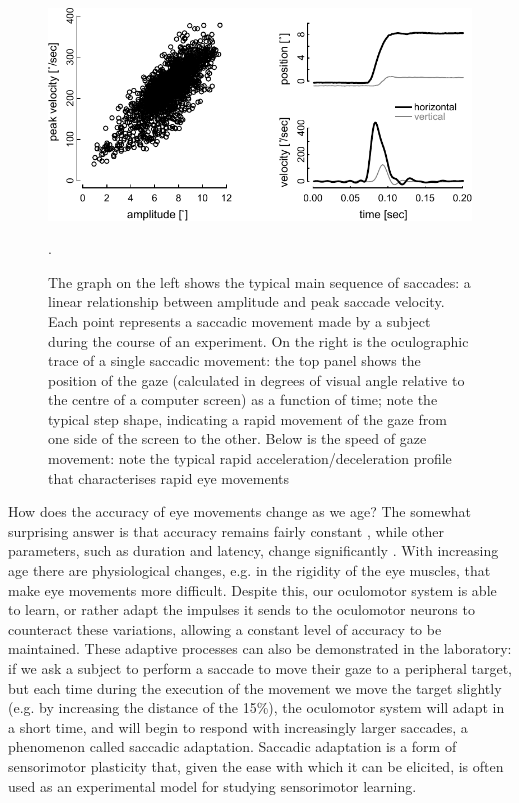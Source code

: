 \documentclass[11pt]{article}
\begin{document}
\begin{figure}
\centering
\includegraphics[width=140mm]{fig2.pdf}
\caption{The graph on the left shows the typical main sequence of saccades: a linear relationship between amplitude and peak saccade velocity. Each point represents a saccadic movement made by a subject during the course of an experiment. On the right is the oculographic trace of a single saccadic movement: the top panel shows the position of the gaze (calculated in degrees of visual angle relative to the centre of a computer screen) as a function of time; note the typical step shape, indicating a rapid movement of the gaze from one side of the screen to the other. Below is the speed of gaze movement: note the typical rapid acceleration/deceleration profile that characterises rapid eye movements}.
\label{fig2}
\end{figure}


How does the accuracy of eye movements change as we age? The somewhat surprising answer is that accuracy remains fairly constant \cite{Warabi1984}, while other parameters, such as duration and latency, change significantly \cite{Munoz1998}. With increasing age there are physiological changes, e.g. in the rigidity of the eye muscles, that make eye movements more difficult. Despite this, our oculomotor system is able to learn, or rather adapt the impulses it sends to the oculomotor neurons to counteract these variations, allowing a constant level of accuracy to be maintained. These adaptive processes can also be demonstrated in the laboratory: if we ask a subject to perform a saccade to move their gaze to a peripheral target, but each time during the execution of the movement we move the target slightly (e.g. by increasing the distance of the 15\%), the oculomotor system will adapt in a short time, and will begin to respond with increasingly larger saccades, a phenomenon called saccadic adaptation\cite{McLaughlin1967}. Saccadic adaptation is a form of sensorimotor plasticity that, given the ease with which it can be elicited, is often used as an experimental model for studying sensorimotor learning.
\end{document}
